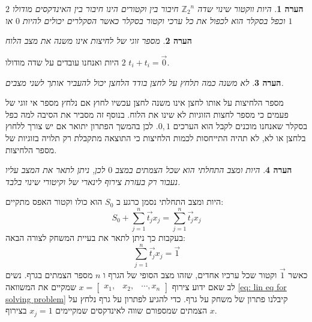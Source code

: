 \documentclass[12pt,leqno]{article}
\theoremstyle{theoremdd}
\newtheorem{comm}{הערה}[section]
\newcommand{\sumi}[1]{\sum_{#1=1}^n}
\newcommand{\Zn}{{\mathbb{Z}_2}^n}
\begin{document}
\begin{comm}
    היות ווקטור שינוי שדה
    $\Zn$
    חיבור בין וקטורים הינו חיבור בין האינדקסים מודולו 
    $2$
    וכפל בסקלר
    הוא לכפול את כל ערכי וקטור בסקלר
    כאשר הסקלרים יכולים להיות
    $0$
    או 
    $1$
\end{comm}
\begin{comm}
    מספר זוגי של לחיצות אינו משנה את מצב הלוח
\end{comm}
היות 
ואנחנו עובדים על שדה מודולו 
$2$
$t_i + t_i = \vec{0}$.
\begin{comm}
    \label{comm: press is uneven presses}
    לא משנה כמה תלחץ על לחצן בודד הלחצן 
    יכול להעביר אותך לשני מצבים.
\end{comm}
מספר הלחיצות על אותו לחצן אינו משנה 
לחצן עכשיו 
לחוץ אם נלחץ מספר אי זוגי של פעמים 
כי מספר לחצות הזוגיות לא שינו את הלוח.
בנוסף זה מסביר את הסיבה למה כפל בסקלר שאנחנו מוכנים לקבל הוא הערכים 
$0,1$.
לכן בהמשך
הפתרון יתואר אם יש צורך ללחוץ בלחצן או לא,
לא תהיה התייחסות לכמות הלחיצות כי התוצאה מתקבלת רק תלויה בזוגיות של מספר הלחיצות.

\begin{comm}
    היות ומצב התחלתי הוא שכל הצמתים 
    במצב 
    $0$
    לכן,
    ניתן לתאר 
    את המצב עליו נעבור
    רק
    בעזרת צירוף לינארי של וקיטורי שינוי בלבד.
\end{comm}
היות ומצב התחלתי נסמן כרגע ב
$S_0$
הוא כולו וקטור האפס
מתקיים:
\begin{equation}
    \label{eq: sum change vectors}
    S_0 + \sumi{j} \vec{t_j} x_j=  \sumi{j}  \vec{t_j}x_j
\end{equation}
בעקבות כך ניתן לתאר את בעיית המשחק לצורה הבאה:
\begin{equation}
    \label{eq: lin eq for solving problem}
    \sumi{j} \vec{t_j} x_j = \vec{1}
\end{equation}
כאשר
$\vec{1}$
וקטור שכל ערכיו אחדים,
שזהו מצב הסופי של הגרף
ו
$n$
מספר הצמתים בגרף.
נשים לב 
שאם 
ידוע צירוף
$x = \begin{bmatrix}
    x_1, & x_2, & \cdots , x_n
\end{bmatrix}$
שמקיים את המשוואה 
\ref{eq: lin eq for solving problem}
קיבלנו פתרון של משחק על גרף.
כדי להגיע לפתרון על גרף נלחץ על הצמתים שמספורם 
שווה 
לאינדקסים 
שמקיימים
$x_j = 1$
בצירוף 
$x$.
\end{document}
